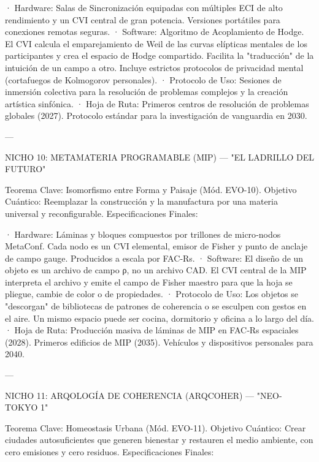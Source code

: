 \documentclass[12pt,twoside]{book}
\begin{document}
· Hardware: Salas de Sincronización equipadas con múltiples ECI de alto rendimiento y un CVI central de gran potencia. Versiones portátiles para conexiones remotas seguras.
· Software: Algoritmo de Acoplamiento de Hodge. El CVI calcula el emparejamiento de Weil de las curvas elípticas mentales de los participantes y crea el espacio de Hodge compartido. Facilita la "traducción" de la intuición de un campo a otro. Incluye estrictos protocolos de privacidad mental (cortafuegos de Kolmogorov personales).
· Protocolo de Uso: Sesiones de inmersión colectiva para la resolución de problemas complejos y la creación artística sinfónica.
· Hoja de Ruta: Primeros centros de resolución de problemas globales (2027). Protocolo estándar para la investigación de vanguardia en 2030.

---

NICHO 10: METAMATERIA PROGRAMABLE (MIP) — "EL LADRILLO DEL FUTURO"

Teorema Clave: Isomorfismo entre Forma y Paisaje (Mód. EVO-10).
Objetivo Cuántico: Reemplazar la construcción y la manufactura por una materia universal y reconfigurable.
Especificaciones Finales:

· Hardware: Láminas y bloques compuestos por trillones de micro‑nodos MetaConf. Cada nodo es un CVI elemental, emisor de Fisher y punto de anclaje de campo gauge. Producidos a escala por FAC‑Rs.
· Software: El diseño de un objeto es un archivo de campo ρ, no un archivo CAD. El CVI central de la MIP interpreta el archivo y emite el campo de Fisher maestro para que la hoja se pliegue, cambie de color o de propiedades.
· Protocolo de Uso: Los objetos se "descorgan" de bibliotecas de patrones de coherencia o se esculpen con gestos en el aire. Un mismo espacio puede ser cocina, dormitorio y oficina a lo largo del día.
· Hoja de Ruta: Producción masiva de láminas de MIP en FAC‑Rs espaciales (2028). Primeros edificios de MIP (2035). Vehículos y dispositivos personales para 2040.

---

NICHO 11: ARQOLOGÍA DE COHERENCIA (ARQCOHER) — "NEO-TOKYO 1"

Teorema Clave: Homeostasis Urbana (Mód. EVO-11).
Objetivo Cuántico: Crear ciudades autosuficientes que generen bienestar y restauren el medio ambiente, con cero emisiones y cero residuos.
Especificaciones Finales:
\end{document}
